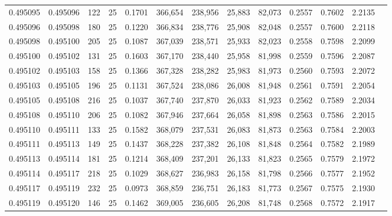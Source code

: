 \begin{tabular}{rrrrrrrrrrrrr}
0.495095 & 0.495096 &   122 &  25 &                                     0.1701 & 366,654 & 238,956 &  25,883 &  82,073 & 0.2557 & 0.7602 & 2.2135 \\
0.495096 & 0.495098 &   180 &  25 &                                     0.1220 & 366,834 & 238,776 &  25,908 &  82,048 & 0.2557 & 0.7600 & 2.2118 \\
0.495098 & 0.495100 &   205 &  25 &                                     0.1087 & 367,039 & 238,571 &  25,933 &  82,023 & 0.2558 & 0.7598 & 2.2099 \\
0.495100 & 0.495102 &   131 &  25 &                                     0.1603 & 367,170 & 238,440 &  25,958 &  81,998 & 0.2559 & 0.7596 & 2.2087 \\
0.495102 & 0.495103 &   158 &  25 &                                     0.1366 & 367,328 & 238,282 &  25,983 &  81,973 & 0.2560 & 0.7593 & 2.2072 \\
0.495103 & 0.495105 &   196 &  25 &                                     0.1131 & 367,524 & 238,086 &  26,008 &  81,948 & 0.2561 & 0.7591 & 2.2054 \\
0.495105 & 0.495108 &   216 &  25 &                                     0.1037 & 367,740 & 237,870 &  26,033 &  81,923 & 0.2562 & 0.7589 & 2.2034 \\
0.495108 & 0.495110 &   206 &  25 &                                     0.1082 & 367,946 & 237,664 &  26,058 &  81,898 & 0.2563 & 0.7586 & 2.2015 \\
0.495110 & 0.495111 &   133 &  25 &                                     0.1582 & 368,079 & 237,531 &  26,083 &  81,873 & 0.2563 & 0.7584 & 2.2003 \\
0.495111 & 0.495113 &   149 &  25 &                                     0.1437 & 368,228 & 237,382 &  26,108 &  81,848 & 0.2564 & 0.7582 & 2.1989 \\
0.495113 & 0.495114 &   181 &  25 &                                     0.1214 & 368,409 & 237,201 &  26,133 &  81,823 & 0.2565 & 0.7579 & 2.1972 \\
0.495114 & 0.495117 &   218 &  25 &                                     0.1029 & 368,627 & 236,983 &  26,158 &  81,798 & 0.2566 & 0.7577 & 2.1952 \\
0.495117 & 0.495119 &   232 &  25 &                                     0.0973 & 368,859 & 236,751 &  26,183 &  81,773 & 0.2567 & 0.7575 & 2.1930 \\
0.495119 & 0.495120 &   146 &  25 &                                     0.1462 & 369,005 & 236,605 &  26,208 &  81,748 & 0.2568 & 0.7572 & 2.1917 \\

\end{tabular}
